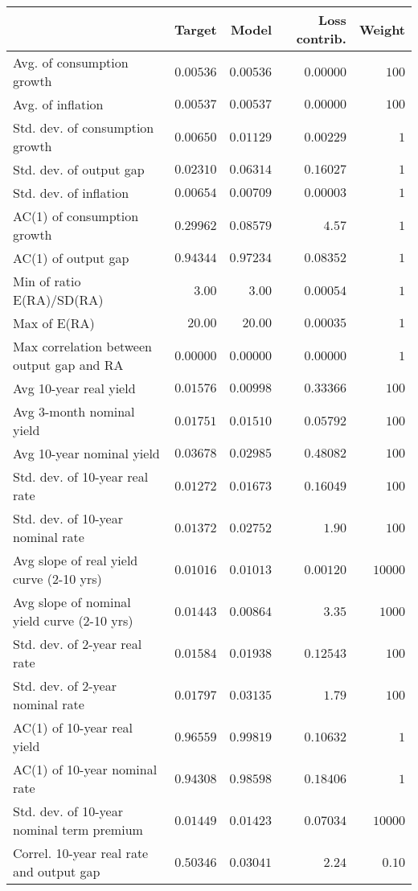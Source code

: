 \begin{tabular}{lrrrr} \hline  & Target & Model & Loss contrib. & Weight \\ \hline Avg. of consumption growth & $0.00536$ & $0.00536$ & $0.00000$ & $100$ \\ Avg. of inflation & $0.00537$ & $0.00537$ & $0.00000$ & $100$ \\ Std. dev. of consumption growth & $0.00650$ & $0.01129$ & $0.00229$ & $1$ \\ Std. dev. of output gap & $0.02310$ & $0.06314$ & $0.16027$ & $1$ \\ Std. dev. of inflation & $0.00654$ & $0.00709$ & $0.00003$ & $1$ \\ AC(1) of consumption growth & $0.29962$ & $0.08579$ & $4.57$ & $1$ \\ AC(1) of output gap & $0.94344$ & $0.97234$ & $0.08352$ & $1$ \\ Min of ratio E(RA)/SD(RA) & $3.00$ & $3.00$ & $0.00054$ & $1$ \\ Max of E(RA) & $20.00$ & $20.00$ & $0.00035$ & $1$ \\ Max correlation between output gap and RA & $0.00000$ & $0.00000$ & $0.00000$ & $1$ \\ Avg 10-year real yield & $0.01576$ & $0.00998$ & $0.33366$ & $100$ \\ Avg 3-month nominal yield & $0.01751$ & $0.01510$ & $0.05792$ & $100$ \\ Avg 10-year nominal yield & $0.03678$ & $0.02985$ & $0.48082$ & $100$ \\ Std. dev. of 10-year real rate & $0.01272$ & $0.01673$ & $0.16049$ & $100$ \\ Std. dev. of 10-year nominal rate & $0.01372$ & $0.02752$ & $1.90$ & $100$ \\ Avg slope of real yield curve (2-10 yrs) & $0.01016$ & $0.01013$ & $0.00120$ & $10000$ \\ Avg slope of nominal yield curve (2-10 yrs) & $0.01443$ & $0.00864$ & $3.35$ & $1000$ \\ Std. dev. of 2-year real rate & $0.01584$ & $0.01938$ & $0.12543$ & $100$ \\ Std. dev. of 2-year nominal rate & $0.01797$ & $0.03135$ & $1.79$ & $100$ \\ AC(1) of 10-year real yield & $0.96559$ & $0.99819$ & $0.10632$ & $1$ \\ AC(1) of 10-year nominal rate & $0.94308$ & $0.98598$ & $0.18406$ & $1$ \\ Std. dev. of 10-year nominal term premium & $0.01449$ & $0.01423$ & $0.07034$ & $10000$ \\ Correl. 10-year real rate and output gap & $0.50346$ & $0.03041$ & $2.24$ & $0.10$ \\ \hline \end{tabular}
